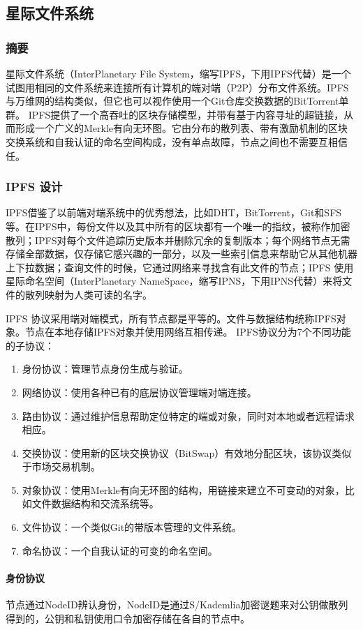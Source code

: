\documentclass{ctexart}
\begin{document}
\subsection{星际文件系统}
\subsubsection{摘要}
星际文件系统（InterPlanetary File System，缩写IPFS，下用IPFS代替）是一个试图用相同的文件系统来连接所有计算机的端对端（P2P）分布文件系统。IPFS 与万维网的结构类似，但它也可以视作使用一个Git仓库交换数据的BitTorrent单群。 IPFS提供了一个高吞吐的区块存储模型，并带有基于内容寻址的超链接，从而形成一个广义的Merkle有向无环图。它由分布的散列表、带有激励机制的区块交换系统和自我认证的命名空间构成，没有单点故障，节点之间也不需要互相信任。
\subsubsection{IPFS 设计}
IPFS借鉴了以前端对端系统中的优秀想法，比如DHT，BitTorrent，Git和SFS等。在IPFS中，每份文件以及其中所有的区块都有一个唯一的指纹，被称作加密散列；IPFS对每个文件追踪历史版本并删除冗余的复制版本；每个网络节点无需存储全部数据，仅存储它感兴趣的一部分，以及一些索引信息来帮助它从其他机器上下拉数据；查询文件的时候，它通过网络来寻找含有此文件的节点；IPFS 使用星际命名空间（InterPlanetary NameSpace，缩写IPNS，下用IPNS代替）来将文件的散列映射为人类可读的名字。

IPFS 协议采用端对端模式，所有节点都是平等的。文件与数据结构统称IPFS对象。节点在本地存储IPFS对象并使用网络互相传递。 IPFS协议分为7个不同功能的子协议：
\begin{enumerate}
	\item 身份协议：管理节点身份生成与验证。
	\item 网络协议：使用各种已有的底层协议管理端对端连接。
	\item 路由协议：通过维护信息帮助定位特定的端或对象，同时对本地或者远程请求相应。
	\item 交换协议：使用新的区块交换协议（BitSwap）有效地分配区块，该协议类似于市场交易机制。
	\item 对象协议：使用Merkle有向无环图的结构，用链接来建立不可变动的对象，比如文件数据结构和交流系统等。
	\item 文件协议：一个类似Git的带版本管理的文件系统。
	\item 命名协议：一个自我认证的可变的命名空间。
\end{enumerate}
\paragraph{身份协议}
节点通过NodeID辨认身份，NodeID是通过S/Kademlia加密谜题来对公钥做散列得到的，公钥和私钥使用口令加密存储在各自的节点中。
\end{document}
